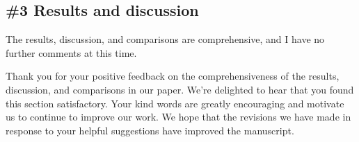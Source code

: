 \subsection{\#3 Results and discussion}\label{sec:2-3}

\RC{} The results, discussion, and comparisons are comprehensive, and I have no further comments at this time.

\AR{} Thank you for your positive feedback on the comprehensiveness of the results, discussion, and comparisons in our paper. We're delighted to hear that you found this section satisfactory. Your kind words are greatly encouraging and motivate us to continue to improve our work. We hope that the revisions we have made in response to your helpful suggestions have improved the manuscript.

